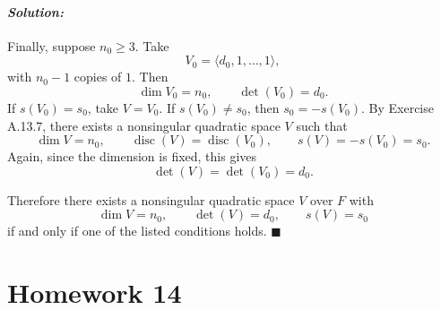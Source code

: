 \documentclass[12pt, a4paper]{article}
\newenvironment{solution}
  {\paragraph{\textit{Solution:}}\par\medskip}
  {\hfill$\blacksquare$\vspace{0.1cm}}
\begin{document}
\begin{solution}
Finally, suppose \(n_0\ge 3\). Take
\[
V_0=\langle d_0,1,\dots,1\rangle ,
\]
with \(n_0-1\) copies of \(1\). Then
\[
\dim V_0=n_0,\qquad \det(V_0)=d_0.
\]
If \(s(V_0)=s_0\), take \(V=V_0\). If \(s(V_0)\neq s_0\), then
\(s_0=-s(V_0)\). By Exercise A.13.7, there exists a nonsingular quadratic
space \(V\) such that
\[
\dim V=n_0,\qquad
\operatorname{disc}(V)=\operatorname{disc}(V_0),
\qquad
s(V)=-s(V_0)=s_0.
\]
Again, since the dimension is fixed, this gives
\[
\det(V)=\det(V_0)=d_0.
\]

Therefore there exists a nonsingular quadratic space \(V\) over \(F\) with
\[
\dim V=n_0,\qquad \det(V)=d_0,\qquad s(V)=s_0
\]
if and only if one of the listed conditions holds.
\end{solution}

\section*{Homework 14}
\end{document}
